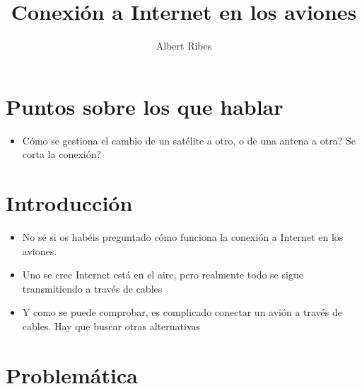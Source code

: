 \documentclass[a6paper]{article}
\author{Albert Ribes}
\title{Conexión a Internet en los aviones}
\begin{document}
    \maketitle

    \section{Puntos sobre los que hablar}
        \begin{itemize}
            \item Cómo se gestiona el cambio de un satélite a otro, o de una antena a otra? Se corta la conexión?
        \end{itemize}


    \section{Introducción}
        \begin{itemize}
            \item No sé si os habéis preguntado cómo funciona la conexión a Internet en los aviones.
            \item Uno se cree Internet está en el aire, pero realmente todo se sigue transmitiendo a través de cables
            \item Y como se puede comprobar, es complicado conectar un avión a través de cables. Hay que buscar otras alternativas
        \end{itemize}

    \section{Problemática}
\end{document}
